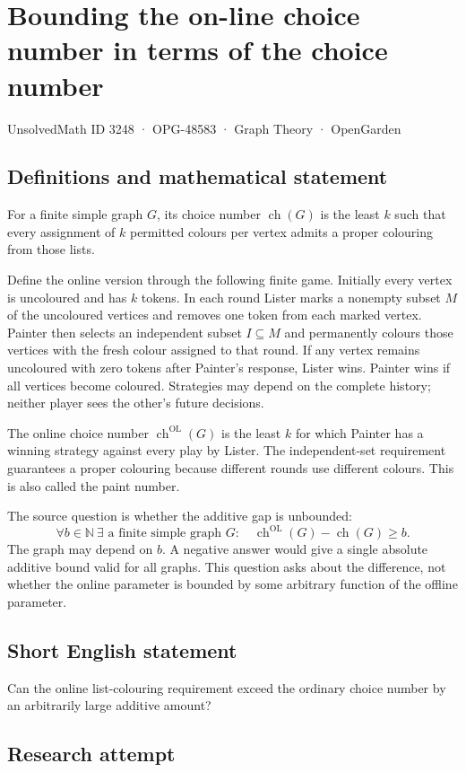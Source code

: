 \documentclass[11pt,a4paper]{article}
\begin{document}
\section*{Bounding the on-line choice number in terms of the choice number}\label{3248}
{\small UnsolvedMath ID 3248 · OPG-48583 · Graph Theory · OpenGarden}
\subsection{Definitions and mathematical statement}
For a finite simple graph $G$, its choice number $\operatorname{ch}(G)$ is
the least $k$ such that every assignment of $k$ permitted colours per
vertex admits a proper colouring from those lists.

Define the online version through the following finite game. Initially
every vertex is uncoloured and has $k$ tokens. In each round Lister marks
a nonempty subset $M$ of the uncoloured vertices and removes one token
from each marked vertex. Painter then selects an independent subset
$I\subseteq M$ and permanently colours those vertices with the fresh
colour assigned to that round. If any vertex remains uncoloured with
zero tokens after Painter's response, Lister wins. Painter wins if all
vertices become coloured. Strategies may depend on the complete history;
neither player sees the other's future decisions.

The online choice number $\operatorname{ch}^{\mathrm{OL}}(G)$ is the least
$k$ for which Painter has a winning strategy against every play by Lister.
The independent-set requirement guarantees a proper colouring because
different rounds use different colours. This is also called the paint
number.

The source question is whether the additive gap is unbounded:
\[
 \forall b\in\mathbb N\ \exists\text{ a finite simple graph }G:
 \quad\operatorname{ch}^{\mathrm{OL}}(G)-\operatorname{ch}(G)\ge b.
\]
The graph may depend on $b$. A negative answer would give a single
absolute additive bound valid for all graphs. This question asks about
the difference, not whether the online parameter is bounded by some
arbitrary function of the offline parameter.
\subsection{Short English statement}
Can the online list-colouring requirement exceed the ordinary choice number by an arbitrarily large additive amount?
\subsection{Research attempt}
\end{document}
